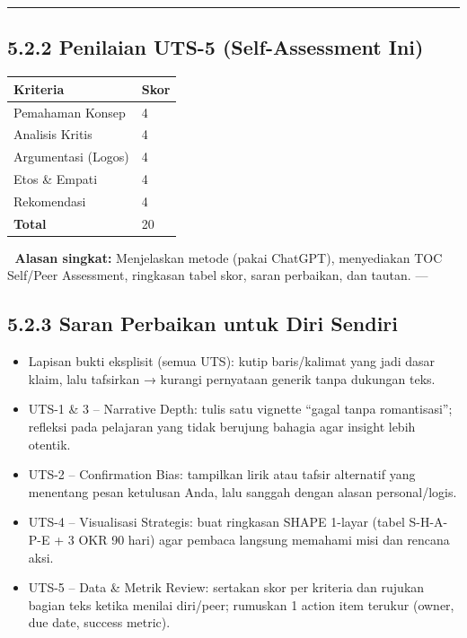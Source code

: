 \documentclass[
  letterpaper,
  DIV=11,
  numbers=noendperiod]{scrreprt}
\providecommand{\tightlist}{%
  \setlength{\itemsep}{0pt}\setlength{\parskip}{0pt}}
\begin{document}
\begin{center}\rule{0.5\linewidth}{0.5pt}\end{center}

\subsection{5.2.2 Penilaian UTS-5 (Self-Assessment
Ini)}\label{penilaian-uts-5-self-assessment-ini}

\begin{longtable}[]{@{}ll@{}}
\toprule\noalign{}
Kriteria & Skor \\
\midrule\noalign{}
\endhead
\bottomrule\noalign{}
\endlastfoot
Pemahaman Konsep & 4 \\
Analisis Kritis & 4 \\
Argumentasi (Logos) & 4 \\
Etos \& Empati & 4 \\
Rekomendasi & 4 \\
\textbf{Total} & 20 \\
\end{longtable}

📝 \textbf{Alasan singkat:} Menjelaskan metode (pakai ChatGPT),
menyediakan TOC Self/Peer Assessment, ringkasan tabel skor, saran
perbaikan, dan tautan. ---

\subsection{5.2.3 Saran Perbaikan untuk Diri
Sendiri}\label{saran-perbaikan-untuk-diri-sendiri}

\begin{itemize}
\tightlist
\item
  Lapisan bukti eksplisit (semua UTS): kutip baris/kalimat yang jadi
  dasar klaim, lalu tafsirkan → kurangi pernyataan generik tanpa
  dukungan teks.
\item
  UTS-1 \& 3 -- Narrative Depth: tulis satu vignette ``gagal tanpa
  romantisasi''; refleksi pada pelajaran yang tidak berujung bahagia
  agar insight lebih otentik.
\item
  UTS-2 -- Confirmation Bias: tampilkan lirik atau tafsir alternatif
  yang menentang pesan ketulusan Anda, lalu sanggah dengan alasan
  personal/logis.
\item
  UTS-4 -- Visualisasi Strategis: buat ringkasan SHAPE 1-layar (tabel
  S-H-A-P-E + 3 OKR 90 hari) agar pembaca langsung memahami misi dan
  rencana aksi.
\item
  UTS-5 -- Data \& Metrik Review: sertakan skor per kriteria dan rujukan
  bagian teks ketika menilai diri/peer; rumuskan 1 action item terukur
  (owner, due date, success metric).
\end{itemize}
\end{document}
